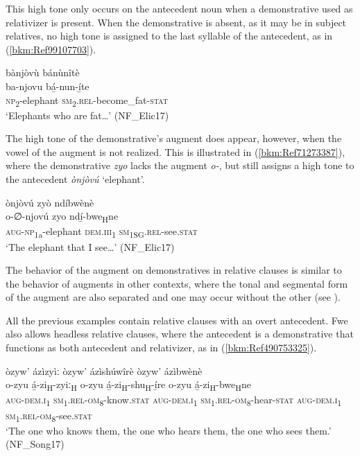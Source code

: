 This high tone only occurs on the antecedent noun when a demonstrative used as relativizer is present. When the demonstrative is absent, as it may be in subject relatives, no high tone is assigned to the last syllable of the antecedent, as in (\ref{bkm:Ref99107703}).

\ea
\label{bkm:Ref99107703}
bànjòvù bánùnîtè\\
\gll ba-njovu  bá̲-nun-í̲te\\
\textsc{np}\textsubscript{2}-elephant  \textsc{sm}\textsubscript{2}.\textsc{rel}-become\_fat-\textsc{stat}\\
\glt ‘Elephants who are fat…’ (NF\_Elic17)
\z

The high tone of the demonstrative’s augment does appear, however, when the vowel of the augment is not realized. This is illustrated in (\ref{bkm:Ref71273387}), where the demonstrative \textit{zyo} lacks the augment \textit{o-}, but still assigns a high tone to the antecedent \textit{ònjòvú} ‘elephant’.

\ea
\label{bkm:Ref71273387}
ònjòvú zyò ndíbwènè\\
\gll o-∅-njovú    zyo    ndí̲-bwe\textsubscript{H}ne\\
\textsc{aug}-\textsc{np}\textsubscript{1a}-elephant  \textsc{dem}.\textsc{iii}\textsubscript{1}  \textsc{sm}\textsubscript{1SG}.\textsc{rel}-see.\textsc{stat}\\
\glt ‘The elephant that I see…’ (NF\_Elic17)
\z

The behavior of the augment on demonstratives in relative clauses is similar to the behavior of augments in other contexts, where the tonal and segmental form of the augment are also separated and one may occur without the other (see ).

All the previous examples contain relative clauses with an overt antecedent. Fwe also allows headless relative clauses, where the antecedent is a demonstrative that functions as both antecedent and relativizer, as in (\ref{bkm:Ref490753325}).

\ea
\label{bkm:Ref490753325}
òzyw’ ázìzyìː òzyw’ ázìshúwîrè òzyw’ ázìbwènè\\
\gll o-zyu    á̲-zi\textsubscript{H}-zyiː\textsubscript{H}      o-zyu    á̲-zi\textsubscript{H}-shu\textsubscript{H}-í̲re o-zyu    á̲-zi\textsubscript{H}-bwe\textsubscript{H}ne\\
\textsc{aug}-\textsc{dem}.\textsc{i}\textsubscript{1}  \textsc{sm}\textsubscript{1}.\textsc{rel}-\textsc{om}\textsubscript{8}-know.\textsc{stat}  \textsc{aug}-\textsc{dem}.\textsc{i}\textsubscript{1}  \textsc{sm}\textsubscript{1}.\textsc{rel}-\textsc{om}\textsubscript{8}-hear-\textsc{stat}
\textsc{aug}-\textsc{dem}.\textsc{i}\textsubscript{1}  \textsc{sm}\textsubscript{1}.\textsc{rel}-\textsc{om}\textsubscript{8}-see.\textsc{stat}\\
\glt ‘The one who knows them, the one who hears them, the one who sees them.’ (NF\_Song17)
\z

